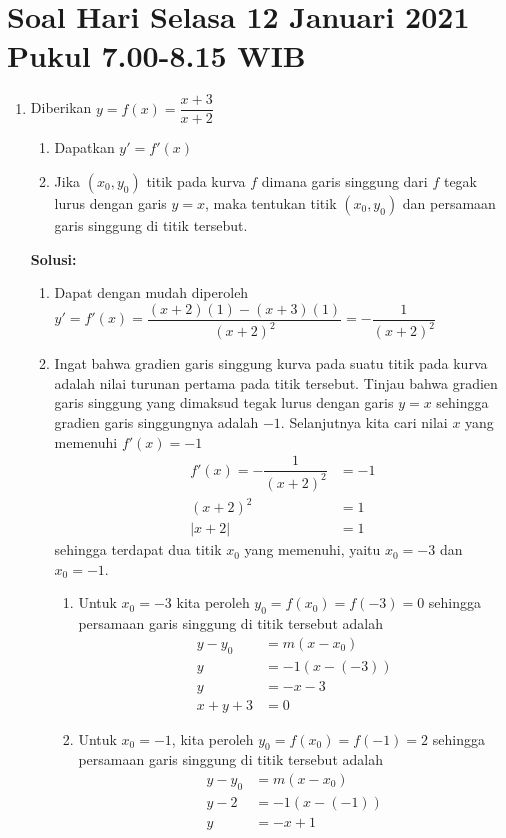 \documentclass{article}
\begin{document}
\section*{Soal Hari Selasa 12 Januari 2021 Pukul 7.00-8.15 WIB}
\begin{enumerate}
	\item Diberikan $y=f(x)=\dfrac{x+3}{x+2}$
	\begin{enumerate}
		\item Dapatkan $y'=f'(x)$
		\item Jika $(x_0,y_0)$ titik pada kurva $f$ dimana garis singgung dari $f$ tegak lurus dengan garis $y=x$, maka tentukan titik $(x_0,y_0)$ dan persamaan garis singgung di titik tersebut.
	\end{enumerate}
	\textbf{Solusi:}
	\begin{enumerate}
		\item Dapat dengan mudah diperoleh $y'=f'(x)=\dfrac{(x+2)(1)-(x+3)(1)}{(x+2)^2} = -\dfrac{1}{(x+2)^2}$
		\item Ingat bahwa gradien garis singgung kurva pada suatu titik pada kurva adalah nilai turunan pertama pada titik tersebut. Tinjau bahwa gradien garis singgung yang dimaksud tegak lurus dengan garis $y=x$ sehingga gradien garis singgungnya adalah $-1$. Selanjutnya kita cari nilai $x$ yang memenuhi $f'(x)=-1$
		\begin{align*}
		f'(x) = -\dfrac{1}{(x+2)^2} &= -1 \\
		(x+2)^2 &=1\\
		|x+2| &= 1 
		\end{align*}
		sehingga terdapat dua titik $x_0$ yang memenuhi, yaitu $x_0=-3$ dan $x_0=-1$. 
		\begin{enumerate}
			\item Untuk $x_0=-3$ kita peroleh $y_0=f(x_0)=f(-3)=0$ sehingga persamaan garis singgung di titik tersebut adalah 
			\begin{align*}
			y-y_0 &= m(x-x_0) \\
			y &= -1(x-(-3)) \\
			y &= -x-3 \\
			x+y +3&= 0
			\end{align*}
			\item Untuk $x_0=-1$, kita peroleh $y_0=f(x_0)=f(-1)=2$ sehingga persamaan garis singgung di titik tersebut adalah 
			\begin{align*}
			y-y_0 &= m(x-x_0)\\
			y-2 &= -1(x-(-1)) \\
			y &= -x+1 \\

\end{align*}
\end{enumerate}
\end{enumerate}
\end{enumerate}
\end{document}
